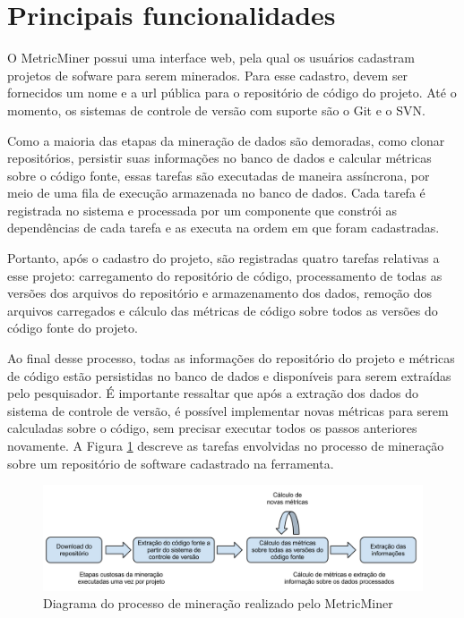 \documentclass[a4paper, 12pt, twoside]{book}
\begin{document}
    
    \section{Principais funcionalidades} \label{sc:abordagem}
        O MetricMiner possui uma interface web, pela qual os usuários cadastram projetos de
        sofware para serem minerados. Para esse cadastro, devem ser fornecidos um nome e a url
        pública para o repositório de código do projeto. Até o momento, os sistemas de controle de versão 
        com suporte são o Git e o SVN.

        Como a maioria das etapas da mineração de dados são demoradas, como
        clonar repositórios, persistir suas informações no banco de dados e calcular métricas sobre o
        código fonte, essas tarefas são executadas de maneira assíncrona, por meio 
        de uma fila de execução armazenada no banco de dados. Cada tarefa é registrada no sistema e 
        processada por um componente que constrói as dependências de cada tarefa e as executa na 
        ordem em que foram cadastradas.

        Portanto, após o cadastro do projeto, são registradas quatro tarefas relativas a esse 
        projeto: carregamento do repositório de código, processamento de todas as versões
        dos arquivos do repositório e armazenamento dos dados,
        remoção dos arquivos carregados e cálculo das métricas de código sobre todos
        as versões do código fonte do projeto.

        Ao final desse processo, todas as informações do repositório do projeto e métricas de código estão persistidas no banco de dados e disponíveis para serem extraídas pelo pesquisador. É importante ressaltar que após a extração dos dados do sistema de controle de versão, é possível implementar novas métricas para serem calculadas sobre o código, sem precisar executar todos os passos anteriores novamente. A Figura \ref{fig:diagrama} descreve as tarefas envolvidas no processo de mineração sobre um repositório de software cadastrado na ferramenta.

        \begin{figure}[ht]
            \centering
            \includegraphics[width=1.0\textwidth]{img/diagrama.png}
            \caption{Diagrama do processo de mineração realizado pelo MetricMiner}
            \label{fig:diagrama}
        \end{figure}
\end{document}

